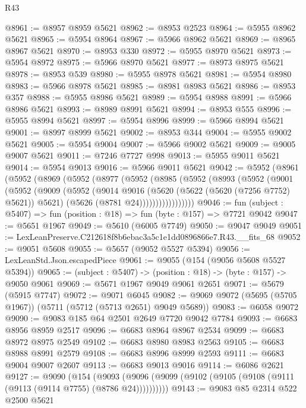 \begin{lexlean}{R43}
\begin{coremodule}
@8961 := @8957 @8959 @5621
@8962 := @8953 @2523
@8964 := @5955 @8962 @5621
@8965 := @5954 @8964
@8967 := @5966 @8962 @5621
@8969 := @8965 @8967 @5621
@8970 := @8953 @330
@8972 := @5955 @8970 @5621
@8973 := @5954 @8972
@8975 := @5966 @8970 @5621
@8977 := @8973 @8975 @5621
@8978 := @8953 @539
@8980 := @5955 @8978 @5621
@8981 := @5954 @8980
@8983 := @5966 @8978 @5621
@8985 := @8981 @8983 @5621
@8986 := @8953 @357
@8988 := @5955 @8986 @5621
@8989 := @5954 @8988
@8991 := @5966 @8986 @5621
@8993 := @8989 @8991 @5621
@8994 := @8953 @555
@8996 := @5955 @8994 @5621
@8997 := @5954 @8996
@8999 := @5966 @8994 @5621
@9001 := @8997 @8999 @5621
@9002 := @8953 @344
@9004 := @5955 @9002 @5621
@9005 := @5954 @9004
@9007 := @5966 @9002 @5621
@9009 := @9005 @9007 @5621
@9011 := @7246 @7727 @998
@9013 := @5955 @9011 @5621
@9014 := @5954 @9013
@9016 := @5966 @9011 @5621
@9042 := @5952
    (@8961
      (@5952
        (@8969
          (@5952
            (@8977
              (@5952
                (@8985
                  (@5952
                    (@8993
                      (@5952
                        (@9001
                          (@5952
                            (@9009
                              (@5952
                                (@9014
                                  @9016
                                  (@5620 (@5622 (@5620 (@7256 @7752) @5621)) @5621)
                                  (@5626 (@8781 @24)))))))))))))))))
@9046 := fun (subject : @5407) => fun (position : @18) => fun (byte : @157) => @7721 @9042
@9047 := @5651 @1967
@9049 := @5610 (@6005 @7749)
@9050 := @9047 @9049
@9051 := LexLeanPreserve.C212618f8b6ebac3a5c1e1dd0896866e7.R43.__fits_68
@9052 := @9051 @5608
@9055 := @5657 (@9052 @5527 @5394)
@9056 := LexLeanStd.Json.escapedPiece
@9061 := @9055 (@154 (@9056 @5608 @5527 @5394))
@9065 := (subject : @5407) -> (position : @18) -> (byte : @157) -> @9050 @9061
@9069 := @5671 @1967 @9049 @9061 @2651
@9071 := @5679 (@5915 @7747)
@9072 := @9071 @6045
@9082 := @9069 @9072 (@5695 (@5705 @1967)) (@5711 (@5712 (@5713 @2651) @9049 @5689))
@9083 := @6058 @9072
@9090 := @9083 @185 @64 @2501 @2649 @7720 @9042 @7784
@9093 := @6683 @8956 @8959 @2517
@9096 := @6683 @8964 @8967 @2534
@9099 := @6683 @8972 @8975 @2549
@9102 := @6683 @8980 @8983 @2563
@9105 := @6683 @8988 @8991 @2579
@9108 := @6683 @8996 @8999 @2593
@9111 := @6683 @9004 @9007 @2607
@9113 := @6683 @9013 @9016
@9114 := @6086 @2621
@9127 := @9090
    (@154 (@9093 (@9096 (@9099 (@9102 (@9105 (@9108 (@9111 (@9113 (@9114 @7755) (@8786 @24))))))))))
@9143 := @9083
    @85
    @2314
    @522
    @2500
    @5621

\end{coremodule}
\end{lexlean}
